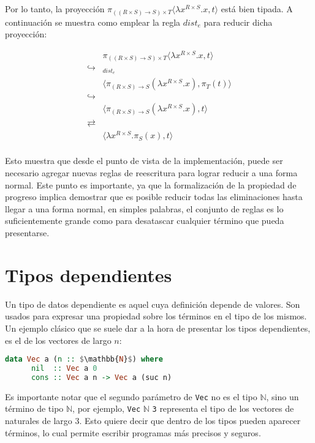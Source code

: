 Por lo tanto, la proyección $\pi_{((R \times S) \rightarrow S) \times T } \langle \lambda x^{R \times S}.x, t \rangle$ está bien tipada.
A continuación se muestra como emplear la regla $dist_e$ para reducir dicha proyección:

\begin{align*}
	& \pi_{((R \times S) \rightarrow S) \times T } \langle \lambda x^{R \times S}.x, t \rangle \\
	\hookrightarrow&_{dist_e} \\
	& \langle \pi_{(R \times S) \rightarrow S}(\lambda x^{R \times S}.x), \pi_T(t) \rangle \\
	\hookrightarrow& \\
	& \langle \pi_{(R \times S) \rightarrow S}(\lambda x^{R \times S}.x), t \rangle \\
	\rightleftarrows& \\
	& \langle \lambda x^{R \times S}. \pi_S(x) , t \rangle \\
\end{align*}

Esto muestra que desde el punto de vista de la implementación, puede ser necesario agregar nuevas reglas de reescritura para lograr reducir a una forma normal.
Este punto es importante, ya que la formalización de la propiedad de progreso implica demostrar que es posible reducir todas las eliminaciones hasta llegar a una forma normal, en simples palabras, el conjunto de reglas es lo suficientemente grande como para desatascar cualquier término que pueda presentarse.
	
\section{Tipos dependientes}

Un tipo de datos dependiente es aquel cuya definición depende de valores.
Son usados para expresar una propiedad sobre los términos en el tipo de los mismos.
Un ejemplo clásico que se suele dar a la hora de presentar los tipos dependientes, es el de los vectores de largo $n$:

\begin{lstlisting}[mathescape, language=Haskell]
  	data Vec a (n :: $\mathbb{N}$) where
	  nil  :: Vec a 0
	  cons :: Vec a n -> Vec a (suc n)
\end{lstlisting}

Es importante notar que el segundo parámetro de \verb|Vec| no es el tipo $\mathbb{N}$, sino un término de tipo $\mathbb{N}$, por ejemplo, \verb|Vec| $\mathbb{N}$ \verb|3| representa el tipo de los vectores de naturales de largo 3.
Esto quiere decir que dentro de los tipos pueden aparecer términos, lo cual permite escribir programas más precisos y seguros.


